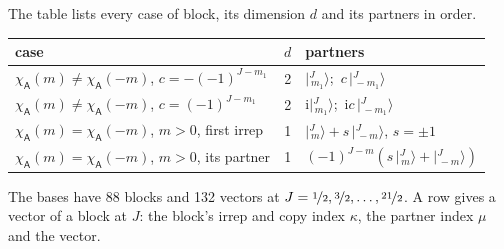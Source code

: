 \documentclass[10pt,a4paper]{article}
\numberwithin{equation}{section}
\newcommand{\grp}[1]{\mathsf{#1}}
\newcommand{\iunit}{\mathrm{i}}
\newcommand{\chiA}{\chi_{\grp{A}}}
\newcommand{\mult}{\kappa}
\newcommand{\intx}{\mu}
\newcommand{\jm}[2]{\bigl\lvert{}^{#1}_{\,#2}\bigr\rangle}
\begin{document}
\leavevmode\label{n:head.case}\label{n:head.partners}The table lists every case of block, its dimension $d$ and its partners in order.
\begin{center}\begin{tabular}{@{}lrl@{}}\toprule
case & $d$ & partners\\\midrule
$\chiA(m) \ne \chiA(-m)$, $c = -(-1)^{J-m_1}$ & 2 & $\jm{J}{m_1}$;\ $c\,\jm{J}{-m_1}$\\
$\chiA(m) \ne \chiA(-m)$, $c = (-1)^{J-m_1}$ & 2 & $\iunit\jm{J}{m_1}$;\ $\iunit c\,\jm{J}{-m_1}$\\
$\chiA(m) = \chiA(-m)$, $m > 0$, first irrep & 1 & $\jm{J}{m} + s\,\jm{J}{-m}$, $s = \pm1$\\
$\chiA(m) = \chiA(-m)$, $m > 0$, its partner & 1 & $(-1)^{J-m}(s\,\jm{J}{m} + \jm{J}{-m})$\\
\bottomrule\end{tabular}\end{center}
The bases have 88 blocks and 132 vectors at $J = \nicefrac{1}{2}, \nicefrac{3}{2}, \dots, \nicefrac{21}{2}$. \label{n:head.vector}A row gives a vector of a block at $J$: the block's irrep and copy index $\mult$, the partner index $\intx$ and the vector.
\end{document}
